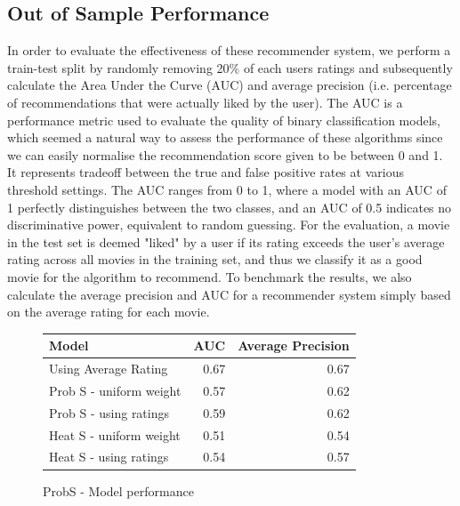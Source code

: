 \documentclass[12pt]{article}
\numberwithin{equation}{section}
\begin{document}
\subsection{Out of Sample Performance}

In order to evaluate the effectiveness of these recommender system, we perform a train-test split by randomly removing 20\% of each users ratings and subsequently calculate the Area Under the Curve (AUC) and average precision (i.e. percentage of recommendations that were actually liked by the user). The AUC is a performance metric used to evaluate the quality of binary classification models, which seemed a natural way to assess the performance of these algorithms since we can easily normalise the recommendation score given to be between 0 and 1. It represents tradeoff between the true and false positive rates at various threshold settings. The AUC ranges from 0 to 1, where a model with an AUC of 1 perfectly distinguishes between the two classes, and an AUC of 0.5 indicates no discriminative power, equivalent to random guessing. For the evaluation, a movie in the test set is deemed "liked" by a user if its rating exceeds the user's average rating across all movies in the training set, and thus we classify it as a good movie for the algorithm to recommend. To benchmark the results, we also calculate the average precision and AUC for a recommender system simply based on the average rating for each movie.

\begin{figure}[!ht]
    \centering  %
    \begin{tabular}{|p{6cm}|r|r|}
        \hline
        \textbf{Model} & \multicolumn{1}{p{4cm}|}{\textbf{AUC}} & \multicolumn{1}{p{4cm}|}{\textbf{Average Precision}}  \\
        \hline
        Using Average Rating & 0.67 & 0.67 \\
        Prob S - uniform weight & 0.57 & 0.62 \\
        Prob S - using ratings & 0.59 & 0.62 \\
        Heat S - uniform weight & 0.51 & 0.54 \\
        Heat S - using ratings & 0.54 & 0.57 \\
        \hline
    \end{tabular}
    \caption{ProbS - Model performance} %
    \label{fig:prob s performance} %
\end{figure}
\end{document}
